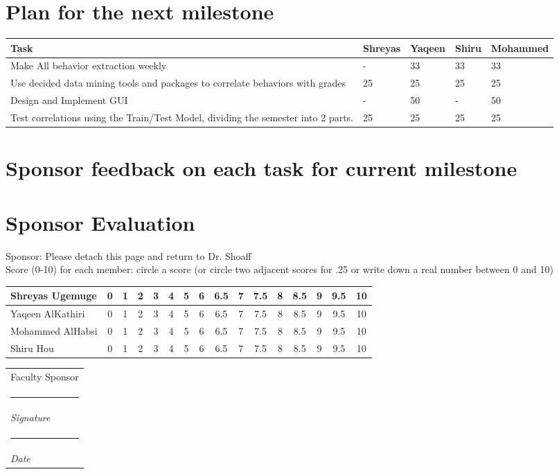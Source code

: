 \documentclass[12pt]{article}
\makeatletter
\newcommand{\namesigdate}[2][5cm]{%
  \begin{tabular}{@{}p{#1}@{}}
    #2 \\[2\normalbaselineskip] \hrule \\[0pt]
    {\small \textit{Signature}} \\ [2\normalbaselineskip] \hrule \\[0pt]
    {\small \textit{Date}}
  \end{tabular}
}
\makeatother
\begin{document}
	\section{Plan for the next milestone}
	\begin{tabularx}{\linewidth}{|X|X|X|X|X|}
	\hline	\textbf{Task} & \textbf{Shreyas} & \textbf{Yaqeen} & \textbf{Shiru} & \textbf{Mohammed} \\ \hline
	Make All behavior extraction weekly & - & 33 & 33 & 33 \\ \hline
	Use decided data mining tools and packages to correlate behaviors with grades & 25 & 25 & 25 & 25 \\ \hline
	Design and Implement GUI & - & 50 & - & 50 \\ \hline
	Test correlations using the Train/Test Model, dividing the semester into 2 parts. & 25 & 25&25&25\\ \hline
	\end{tabularx}


	\pagebreak
	\section{Sponsor feedback on each task for current milestone}
	\pagebreak
	\section{Sponsor Evaluation}
	Sponsor: Please detach this page and return to Dr. Shoaff \\ \hfill \break 
	Score (0-10) for each member: circle a score (or circle two adjacent scores for .25 or write down a real number between 0 and 10) \\ \hfill \break
	\begin{tabularx}{\textwidth}{|X|c|c|c|c|c|c|c|c|c|c|c|c|c|c|c|}
	\hline
	Shreyas Ugemuge & 0 & 1 &  2 & 3 & 4 & 5 & 6 & 6.5 & 7 & 7.5 & 8 & 8.5 & 9 & 9.5 & 10 \\ \hline
	Yaqeen AlKathiri & 0 & 1 &  2 & 3 & 4 & 5 & 6 & 6.5 & 7 & 7.5 & 8 & 8.5 & 9 & 9.5 & 10 \\ \hline
	Mohammed AlHabsi & 0 & 1 &  2 & 3 & 4 & 5 & 6 & 6.5 & 7 & 7.5 & 8 & 8.5 & 9 & 9.5 & 10 \\ \hline
	Shiru Hou & 0 & 1 &  2 & 3 & 4 & 5 & 6 & 6.5 & 7 & 7.5 & 8 & 8.5 & 9 & 9.5 & 10 \\ 
	\hline 
	\end{tabularx}
	\hfil \break
	\hfil \break
	\namesigdate{Faculty Sponsor}
	
\end{document}
